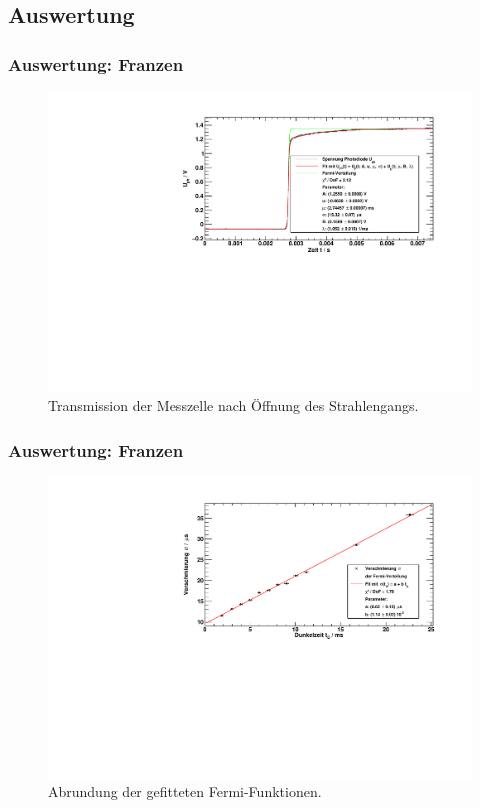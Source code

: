 \subsection{Auswertung}
\begin{frame}
\frametitle{Auswertung: Franzen}

\begin{figure}
    \centering
    \includegraphics[width=\textwidth]{../img/04.pdf}
    \caption{Transmission der Messzelle nach Öffnung des Strahlengangs.}  
\end{figure} 
  
\end{frame}


\begin{frame}
\frametitle{Auswertung: Franzen}

\begin{figure}
    \centering
    \includegraphics[width=\textwidth]{../img/sigmaFit.pdf}
    \caption{Abrundung der gefitteten Fermi-Funktionen.}  
\end{figure} 
  
\end{frame}


